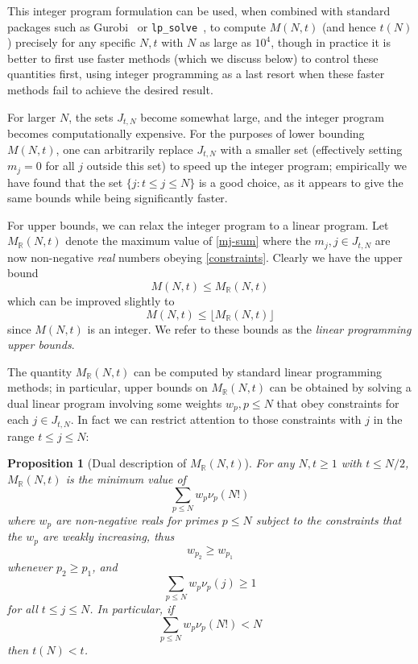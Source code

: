 \documentclass[10pt,a4paper,reqno]{amsart}
\numberwithin{equation}{section}
\theoremstyle{plain}
\newtheorem{proposition}[theorem]{Proposition}
\theoremstyle{definition}
\newcommand\R{\mathbb{R}}
\begin{document}
This integer program formulation can be used, when combined with standard packages such as Gurobi~\cite{gurobi} or \texttt{lp\_solve}~\cite{lpsolve}, to compute $M(N,t)$ (and hence $t(N)$) precisely for any specific $N,t$ with $N$ as large as $10^4$, though in practice it is better to first use faster methods (which we discuss below) to control these quantities first, using integer programming as a last resort when these faster methods fail to achieve the desired result.

For larger $N$, the sets $J_{t,N}$ become somewhat large, and the integer program becomes computationally expensive.  For the purposes of lower bounding $M(N,t)$, one can arbitrarily replace $J_{t,N}$ with a smaller set (effectively setting $m_j=0$ for all $j$ outside this set) to speed up the integer program; empirically we have found that the set $\{ j: t \leq j \leq N \}$ is a good choice, as it appears to give the same bounds while being significantly faster.

For upper bounds, we can relax the integer program to a linear program.  Let $M_\R(N,t)$ denote the maximum value of \eqref{mj-sum} where the $m_j, j \in J_{t,N}$ are now non-negative \emph{real} numbers obeying \eqref{constraints}.  Clearly we have the upper bound
$$ M(N,t) \leq M_\R(N,t)$$
which can be improved slightly to
\begin{equation}\label{lp-upper} 
  M(N,t) \leq \lfloor M_\R(N,t)\rfloor
\end{equation}
since $M(N,t)$ is an integer.  We refer to these bounds as the \emph{linear programming upper bounds}.

The quantity $M_\R(N,t)$ can be computed by standard linear programming methods; in particular, upper bounds on $M_\R(N,t)$ can be obtained by solving a dual linear program involving some weights $w_p, p \leq N$ that obey constraints for each $j \in J_{t,N}$.  In fact we can restrict attention to those constraints with $j$ in the range $t \leq j \leq N$:

\begin{proposition}[Dual description of $M_\R(N,t)$]\label{dual-desc} For any $N,t \geq 1$ with $t \leq N/2$, $M_\R(N,t)$ is the minimum value of
\begin{equation}\label{hyp}
    \sum_{p \leq N} w_p \nu_p(N!)
\end{equation}
where $w_p$ are non-negative reals for primes $p \leq N$
subject to the constraints that the $w_p$ are weakly increasing, thus
\begin{equation}\label{wp-decrease}
w_{p_2} \geq w_{p_1}
\end{equation}
whenever $p_2 \geq p_1$, and 
\begin{equation}\label{pj}
  \sum_{p \leq N} w_p \nu_p(j) \geq 1
 \end{equation}
for all $t \leq j \leq N$.  In particular, if
\begin{equation}\label{hyp-low}
  \sum_{p \leq N} w_p \nu_p(N!) < N
\end{equation}
then $t(N) < t$.
\end{proposition}
\end{document}
